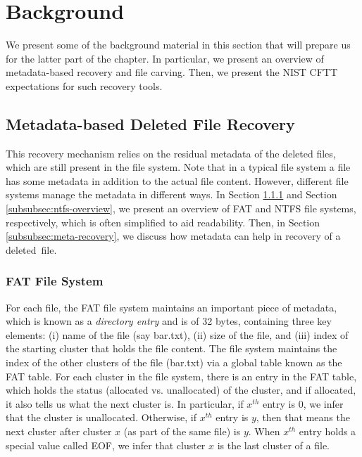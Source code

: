 \section{Background}

We present some of the background material in this section that will prepare
us for the latter part of the chapter. 
In particular, we present an overview of metadata-based recovery and file carving. 
Then, we present the NIST CFTT expectations for such recovery tools.  


\subsection{Metadata-based Deleted File Recovery}
This recovery mechanism relies on the residual metadata of the deleted files, 
which are still present in the file system. Note that in a typical file system 
a file has some metadata in addition to the actual file content. However,
different file systems
manage the metadata in different ways.
In Section \ref{subsubsec:fat-overview} and Section \ref{subsubsec:ntfs-overview}, 
we present an overview of FAT and NTFS file systems, respectively, which is often
simplified to aid readability. 
Then, in Section \ref{subsubsec:meta-recovery}, we discuss how metadata can help in 
recovery of a deleted~file.


\subsubsection{FAT File System} \label{subsubsec:fat-overview}

For each file, the FAT file system maintains an important piece of metadata, 
which is known as a \emph{directory entry} and is of 32 bytes, containing three 
key elements: (i) name of the file (say bar.txt), (ii) size of the file, and 
(iii) index of the starting cluster that holds the file content. 
The file system maintains the index of the other clusters of the file (bar.txt) 
via a global table known as the FAT table. For each cluster in the file system, 
there is an entry in the FAT table, which holds the status 
(allocated vs. unallocated) of the cluster, and if allocated, 
it also tells us what the next cluster is. In particular, if $x^{th}$ entry is $0$, 
we infer that the cluster is unallocated. Otherwise, if $x^{th}$ entry is $y$, then 
that means the next cluster after cluster $x$ (as part of the same file) is $y$.
When $x^{th}$ entry holds a special value called EOF, we infer that cluster $x$ is
the last cluster of a file.

